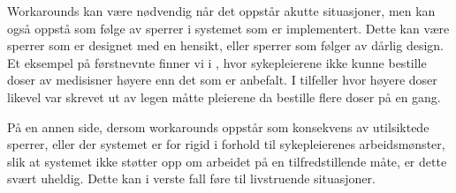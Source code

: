 \noindent
Workarounds kan være nødvendig når det oppstår akutte situasjoner, men kan også oppstå som følge av sperrer i systemet som er implementert. Dette kan være sperrer som er designet med en hensikt, eller sperrer som følger av dårlig design. Et eksempel på førstnevnte finner vi i \cite{Vogelsmeier08}, hvor sykepleierene ikke kunne bestille doser av medisisner høyere enn det som er anbefalt. I tilfeller hvor høyere doser likevel var skrevet ut av legen måtte pleierene da bestille flere doser på en gang.  

\noindent
På en annen side, dersom workarounds oppstår som konsekvens av utilsiktede sperrer, eller der systemet er for rigid i forhold til sykepleierenes arbeidsmønster, slik at systemet ikke støtter opp om arbeidet på en tilfredstillende måte, er dette svært uheldig. Dette kan i verste fall føre til livstruende situasjoner.